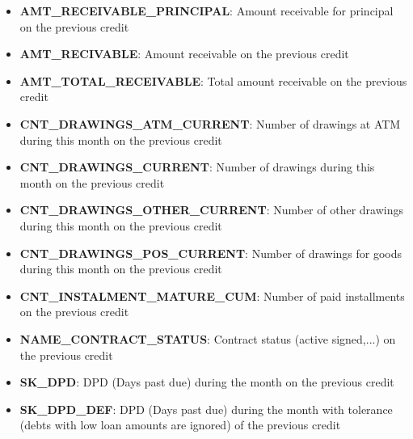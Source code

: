 \documentclass[11pt]{article}
\begin{document}
\begin{itemize}
\item
  \textbf{AMT\_RECEIVABLE\_PRINCIPAL}: Amount receivable for principal
  on the previous credit\\
\item
  \textbf{AMT\_RECIVABLE}: Amount receivable on the previous credit\\
\item
  \textbf{AMT\_TOTAL\_RECEIVABLE}: Total amount receivable on the
  previous credit
\item
  \textbf{CNT\_DRAWINGS\_ATM\_CURRENT}: Number of drawings at ATM during
  this month on the previous credit\\
\item
  \textbf{CNT\_DRAWINGS\_CURRENT}: Number of drawings during this month
  on the previous credit
\item
  \textbf{CNT\_DRAWINGS\_OTHER\_CURRENT}: Number of other drawings
  during this month on the previous credit
\item
  \textbf{CNT\_DRAWINGS\_POS\_CURRENT}: Number of drawings for goods
  during this month on the previous credit\\
\item
  \textbf{CNT\_INSTALMENT\_MATURE\_CUM}: Number of paid installments on
  the previous credit
\item
  \textbf{NAME\_CONTRACT\_STATUS}: Contract status (active signed,...)
  on the previous credit\\
\item
  \textbf{SK\_DPD}: DPD (Days past due) during the month on the previous
  credit
\item
  \textbf{SK\_DPD\_DEF}: DPD (Days past due) during the month with
  tolerance (debts with low loan amounts are ignored) of the previous
  credit
\end{itemize}


    
    
    
    
\end{document}
